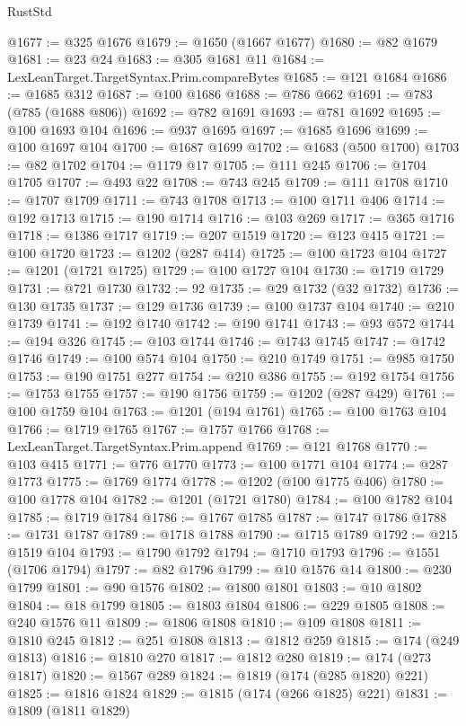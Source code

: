 \begin{lexlean}{RustStd}
\begin{coremodule}
@1677 := @325 @1676
@1679 := @1650 (@1667 @1677)
@1680 := @82 @1679
@1681 := @23 @24
@1683 := @305 @1681 @11
@1684 := LexLeanTarget.TargetSyntax.Prim.compareBytes
@1685 := @121 @1684
@1686 := @1685 @312
@1687 := @100 @1686
@1688 := @786 @662
@1691 := @783 (@785 (@1688 @806))
@1692 := @782 @1691
@1693 := @781 @1692
@1695 := @100 @1693 @104
@1696 := @937 @1695
@1697 := @1685 @1696
@1699 := @100 @1697 @104
@1700 := @1687 @1699
@1702 := @1683 (@500 @1700)
@1703 := @82 @1702
@1704 := @1179 @17
@1705 := @111 @245
@1706 := @1704 @1705
@1707 := @493 @22
@1708 := @743 @245
@1709 := @111 @1708
@1710 := @1707 @1709
@1711 := @743 @1708
@1713 := @100 @1711 @406
@1714 := @192 @1713
@1715 := @190 @1714
@1716 := @103 @269
@1717 := @365 @1716
@1718 := @1386 @1717
@1719 := @207 @1519
@1720 := @123 @415
@1721 := @100 @1720
@1723 := @1202 (@287 @414)
@1725 := @100 @1723 @104
@1727 := @1201 (@1721 @1725)
@1729 := @100 @1727 @104
@1730 := @1719 @1729
@1731 := @721 @1730
@1732 := 92
@1735 := @29 @1732 (@32 @1732)
@1736 := @130 @1735
@1737 := @129 @1736
@1739 := @100 @1737 @104
@1740 := @210 @1739
@1741 := @192 @1740
@1742 := @190 @1741
@1743 := @93 @572
@1744 := @194 @326
@1745 := @103 @1744
@1746 := @1743 @1745
@1747 := @1742 @1746
@1749 := @100 @574 @104
@1750 := @210 @1749
@1751 := @985 @1750
@1753 := @190 @1751 @277
@1754 := @210 @386
@1755 := @192 @1754
@1756 := @1753 @1755
@1757 := @190 @1756
@1759 := @1202 (@287 @429)
@1761 := @100 @1759 @104
@1763 := @1201 (@194 @1761)
@1765 := @100 @1763 @104
@1766 := @1719 @1765
@1767 := @1757 @1766
@1768 := LexLeanTarget.TargetSyntax.Prim.append
@1769 := @121 @1768
@1770 := @103 @415
@1771 := @776 @1770
@1773 := @100 @1771 @104
@1774 := @287 @1773
@1775 := @1769 @1774
@1778 := @1202 (@100 @1775 @406)
@1780 := @100 @1778 @104
@1782 := @1201 (@1721 @1780)
@1784 := @100 @1782 @104
@1785 := @1719 @1784
@1786 := @1767 @1785
@1787 := @1747 @1786
@1788 := @1731 @1787
@1789 := @1718 @1788
@1790 := @1715 @1789
@1792 := @215 @1519 @104
@1793 := @1790 @1792
@1794 := @1710 @1793
@1796 := @1551 (@1706 @1794)
@1797 := @82 @1796
@1799 := @10 @1576 @14
@1800 := @230 @1799
@1801 := @90 @1576
@1802 := @1800 @1801
@1803 := @10 @1802
@1804 := @18 @1799
@1805 := @1803 @1804
@1806 := @229 @1805
@1808 := @240 @1576 @11
@1809 := @1806 @1808
@1810 := @109 @1808
@1811 := @1810 @245
@1812 := @251 @1808
@1813 := @1812 @259
@1815 := @174 (@249 @1813)
@1816 := @1810 @270
@1817 := @1812 @280
@1819 := @174 (@273 @1817)
@1820 := @1567 @289
@1824 := @1819 (@174 (@285 @1820) @221)
@1825 := @1816 @1824
@1829 := @1815 (@174 (@266 @1825) @221)
@1831 := @1809 (@1811 @1829)

\end{coremodule}
\end{lexlean}
